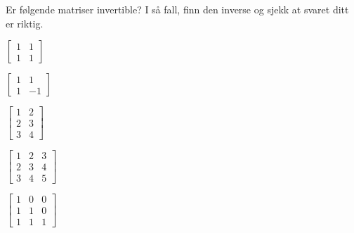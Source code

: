 \begin{oppgave}
Er følgende matriser invertible? I så fall, finn den inverse og sjekk at svaret ditt er riktig. 

\begin{punkt}
$\begin{bmatrix}
1 & 1\\
1 & 1
\end{bmatrix}$
\end{punkt}

\begin{punkt}
$\begin{bmatrix}
1 & 1\\
1 & -1
\end{bmatrix}$
\end{punkt}

\begin{punkt}
$\begin{bmatrix}
1 & 2\\
2 & 3\\
3 & 4
\end{bmatrix}$
\end{punkt}

\begin{punkt}
$\begin{bmatrix}
1 & 2 & 3\\
2 & 3 & 4\\
3 & 4 & 5
\end{bmatrix}$
\end{punkt}

\begin{punkt}
$\begin{bmatrix}
1 & 0 & 0\\
1 & 1 & 0\\
1 & 1 & 1
\end{bmatrix}$
\end{punkt}


\end{oppgave}



